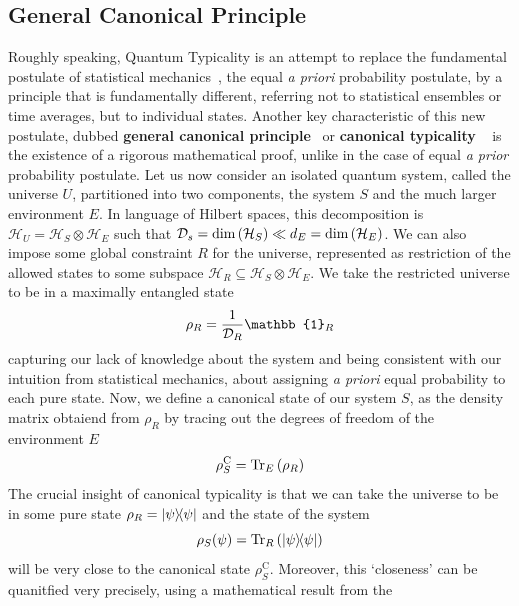 \subsection{\label{sec:gcp} General Canonical Principle}
Roughly speaking, Quantum Typicality is an attempt to replace the fundamental postulate of statistical mechanics~\autocite{huang1987statistical},
the equal \textit{a priori} probability postulate, by a principle that is fundamentally different, referring not to
statistical ensembles or time averages, but to individual states. Another key characteristic of
this new postulate, dubbed \textbf{general canonical principle}~\autocite{Popescu2006} or \textbf{canonical typicality}
~\autocite{Goldstein2006} is the existence of a rigorous mathematical proof, unlike in the case of equal
 \textit{a prior} probability postulate. Let us now consider an isolated quantum system, called the universe \(U\), partitioned
 into two components, the system \(S\) and the much larger environment \(E\). In language of Hilbert spaces, this decomposition is
 \(\mathcal{H}_U = \mathcal{H}_S \otimes \mathcal{H}_E\) such that \(\mathcal{D}_s = \mathrm{dim}\left(\mathcal{H}_S\right)
 \ll d_E = \mathrm{dim}\left(\mathcal{H}_E\right)\). We can also impose some global constraint \(R\) for the universe, represented
 as restriction of the allowed states to some subspace \(\mathcal{H}_R \subseteq  \mathcal{H}_S \otimes \mathcal{H}_E \).
 We take the restricted universe to be in a maximally entangled state
 \begin{equation}
	\rho_R = \frac{1}{\dimension_R} \mathbb{1}_R
 \end{equation}
capturing our lack of knowledge about the system and being consistent with our intuition from statistical mechanics, about assigning
\textit{a priori} equal probability to each pure state. Now, we define a canonical state of our system \(S\), as the density
matrix obtaiend from \(\rho_R\) by tracing out the degrees of freedom of the environment \(E\)
\begin{equation}
	\rho_S^{\mathrm{C}} = \Tr_E\left(\rho_R\right)
\end{equation}
The crucial insight of canonical typicality is that we can take the universe to be in some pure state \(\rho_R = \ketbra{\psi}{\psi}\)
and the state of the system 
\begin{equation}
	\rho_S(\psi) = \Tr_R \left(\ketbra{\psi}{\psi}\right)
\end{equation}
 will be very close to the canonical state
\(\rho_S^{\mathrm{C}}\). Moreover, this `closeness' can be quanitfied very precisely, using a mathematical result from the
